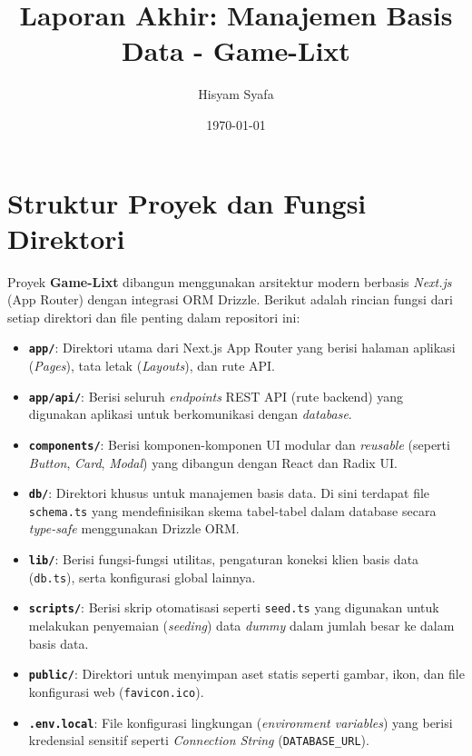 \documentclass[12pt,a4paper]{article}
\title{Laporan Akhir: Manajemen Basis Data - Game-Lixt}
\author{Hisyam Syafa}
\date{\today}
\begin{document}
\maketitle

\tableofcontents
\newpage

\section{Struktur Proyek dan Fungsi Direktori}

Proyek \textbf{Game-Lixt} dibangun menggunakan arsitektur modern berbasis \textit{Next.js} (App Router) dengan integrasi ORM Drizzle. Berikut adalah rincian fungsi dari setiap direktori dan file penting dalam repositori ini:

\begin{itemize}
    \item \textbf{\texttt{app/}}: Direktori utama dari Next.js App Router yang berisi halaman aplikasi (\textit{Pages}), tata letak (\textit{Layouts}), dan rute API.
    \item \textbf{\texttt{app/api/}}: Berisi seluruh \textit{endpoints} REST API (rute backend) yang digunakan aplikasi untuk berkomunikasi dengan \textit{database}.
    \item \textbf{\texttt{components/}}: Berisi komponen-komponen UI modular dan \textit{reusable} (seperti \textit{Button}, \textit{Card}, \textit{Modal}) yang dibangun dengan React dan Radix UI.
    \item \textbf{\texttt{db/}}: Direktori khusus untuk manajemen basis data. Di sini terdapat file \texttt{schema.ts} yang mendefinisikan skema tabel-tabel dalam database secara \textit{type-safe} menggunakan Drizzle ORM.
    \item \textbf{\texttt{lib/}}: Berisi fungsi-fungsi utilitas, pengaturan koneksi klien basis data (\texttt{db.ts}), serta konfigurasi global lainnya.
    \item \textbf{\texttt{scripts/}}: Berisi skrip otomatisasi seperti \texttt{seed.ts} yang digunakan untuk melakukan penyemaian (\textit{seeding}) data \textit{dummy} dalam jumlah besar ke dalam basis data.
    \item \textbf{\texttt{public/}}: Direktori untuk menyimpan aset statis seperti gambar, ikon, dan file konfigurasi web (\texttt{favicon.ico}).
    \item \textbf{\texttt{.env.local}}: File konfigurasi lingkungan (\textit{environment variables}) yang berisi kredensial sensitif seperti \textit{Connection String} (\texttt{DATABASE\_URL}).
\end{itemize}
\end{document}
